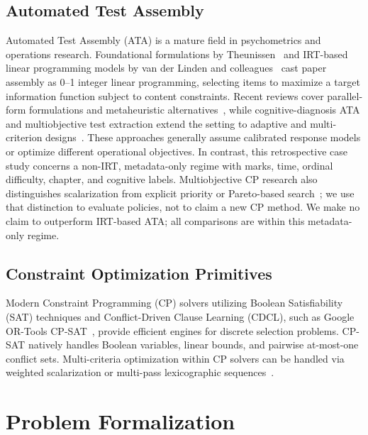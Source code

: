 \documentclass[runningheads]{llncs}
\begin{document}
\subsection{Automated Test Assembly}
Automated Test Assembly (ATA) is a mature field in psychometrics and operations research. Foundational formulations by Theunissen~\cite{theunissen1985} and IRT-based linear programming models by van der Linden and colleagues~\cite{vanderLinden2005,vanderLinden1989,lord1980} cast paper assembly as 0--1 integer linear programming, selecting items to maximize a target information function subject to content constraints. Recent reviews cover parallel-form formulations and metaheuristic alternatives~\cite{ignjatovic2021}, while cognitive-diagnosis ATA and multiobjective test extraction extend the setting to adaptive and multi-criterion designs~\cite{li2021,nguyen2021}. These approaches generally assume calibrated response models or optimize different operational objectives. In contrast, this retrospective case study concerns a non-IRT, metadata-only regime with marks, time, ordinal difficulty, chapter, and cognitive labels. Multiobjective CP research also distinguishes scalarization from explicit priority or Pareto-based search~\cite{bennetto2021,ehrgott2005}; we use that distinction to evaluate policies, not to claim a new CP method. We make no claim to outperform IRT-based ATA; all comparisons are within this metadata-only regime.

\subsection{Constraint Optimization Primitives}
Modern Constraint Programming (CP) solvers utilizing Boolean Satisfiability (SAT) techniques and Conflict-Driven Clause Learning (CDCL), such as Google OR-Tools CP-SAT~\cite{perron2023,nieuwenhuis2006}, provide efficient engines for discrete selection problems. CP-SAT natively handles Boolean variables, linear bounds, and pairwise at-most-one conflict sets. Multi-criteria optimization within CP solvers can be handled via weighted scalarization or multi-pass lexicographic sequences~\cite{ehrgott2005,ignizio1976}.

\section{Problem Formalization}
\label{sec:formalization}
\end{document}
